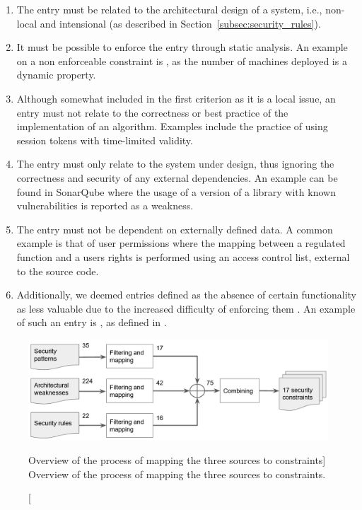 \begin{enumerate}
    \item The entry must be related to the architectural design of a system, i.e., non-local and intensional (as described in Section~\ref{subsec:security_rules}). \label{criterion_1}
    \item It must be possible to enforce the entry through static analysis. An example on a non enforceable constraint is  \cite{franch_constraining_2019}, as the number of machines deployed is a dynamic property. \label{criterion_2}
    \item Although somewhat included in the first criterion as it is a local issue, an entry must not relate to the correctness or best practice of the implementation of an algorithm. Examples include the practice of using session tokens with time-limited validity. \label{criterion_3}
    \item The entry must only relate to the system under design, thus ignoring the correctness and security of any external dependencies. An example can be found in SonarQube where the usage of a version of a library with known vulnerabilities is reported as a weakness. \label{criterion_4}
    \item The entry must not be dependent on externally defined data. A common example is that of user permissions where the mapping between a regulated function and a users rights is performed using an access control list, external to the source code. \label{criterion_5}
    \item Additionally, we deemed entries defined as the absence of certain functionality as less valuable due to the increased difficulty of enforcing them \cite{haley_security_2008}. An example of such an entry is , as defined in \cite{franch_constraining_2019}.
\end{enumerate}

\begin{figure}
    \centering
    \captionsetup{justification=centering}
    \includegraphics[width=\textwidth]{figure/SelectionProcess.png}
    \caption
        [Overview of the process of mapping the three sources to constraints]
        {Overview of the process of mapping the three sources to constraints.}
    \label{fig:mapping_process}
\end{figure}

